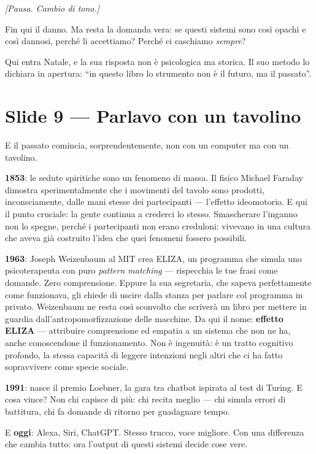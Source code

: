 \documentclass[a4paper,11pt]{article}
\newcommand{\regia}[1]{\begin{center}\textit{\footnotesize\textcolor{gray!55!black}{#1}}\end{center}}
\newcommand{\slide}[1]{\section*{#1}\addcontentsline{toc}{section}{#1}}
\begin{document}
\regia{[Pausa. Cambio di tono.]}

Fin qui il danno. Ma resta la domanda vera: se questi sistemi sono così opachi e così dannosi, perché li accettiamo? Perché ci caschiamo \emph{sempre}?

Qui entra Natale, e la sua risposta non è psicologica ma storica. Il suo metodo lo dichiara in apertura: ``in questo libro lo strumento non è il futuro, ma il passato''.

\slide{Slide 9 --- Parlavo con un tavolino}

E il passato comincia, sorprendentemente, non con un computer ma con un tavolino.

\textbf{1853}: le sedute spiritiche sono un fenomeno di massa. Il fisico Michael Faraday dimostra sperimentalmente che i movimenti del tavolo sono prodotti, inconsciamente, dalle mani stesse dei partecipanti --- l'effetto ideomotorio. E qui il punto cruciale: la gente continua a crederci lo stesso. Smascherare l'inganno non lo spegne, perché i partecipanti non erano creduloni: vivevano in una cultura che aveva già costruito l'idea che quei fenomeni fossero possibili.

\textbf{1963}: Joseph Weizenbaum al MIT crea ELIZA, un programma che simula uno psicoterapeuta con puro \emph{pattern matching} --- rispecchia le tue frasi come domande. Zero comprensione. Eppure la sua segretaria, che sapeva perfettamente come funzionava, gli chiede di uscire dalla stanza per parlare col programma in privato. Weizenbaum ne resta così sconvolto che scriverà un libro per mettere in guardia dall'antropomorfizzazione delle macchine. Da qui il nome: \textbf{effetto ELIZA} --- attribuire comprensione ed empatia a un sistema che non ne ha, anche conoscendone il funzionamento. Non è ingenuità: è un tratto cognitivo profondo, la stessa capacità di leggere intenzioni negli altri che ci ha fatto sopravvivere come specie sociale.

\textbf{1991}: nasce il premio Loebner, la gara tra chatbot ispirata al test di Turing. E cosa vince? Non chi capisce di più: chi recita meglio --- chi simula errori di battitura, chi fa domande di ritorno per guadagnare tempo.

E \textbf{oggi}: Alexa, Siri, ChatGPT. Stesso trucco, voce migliore. Con una differenza che cambia tutto: ora l'output di questi sistemi decide cose vere.
\end{document}
